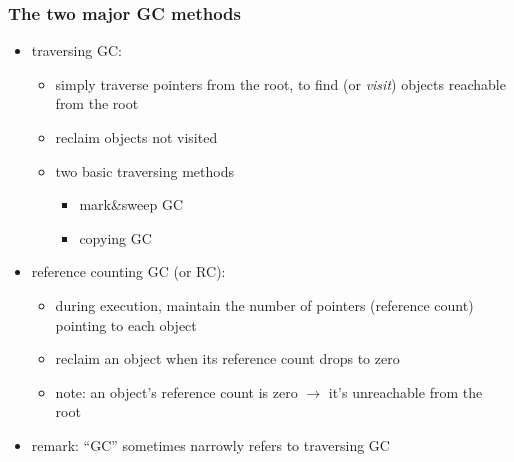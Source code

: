 \documentclass[12pt,dvipdfmx]{beamer}
\newif\ifja
\newif\ifeng
\newcommand{\mura}[1]{{\color{purple}#1}}
\newcommand{\ao}[1]{{\color{blue}#1}}
\begin{document}
\begin{frame}
\frametitle{The two major GC methods}
\begin{itemize}
\item \ao{traversing GC:}
  \begin{itemize}
  \item simply traverse pointers from the root, to find (or {\it visit})
    objects \mura{reachable from the root}
  \item \mura{reclaim objects not visited}
  \item two basic traversing methods 
    \begin{itemize}
    \item \ao{mark\&sweep GC}
    \item \ao{copying GC}
    \end{itemize}
  \end{itemize}
\item \ao{reference counting GC (or RC):}
  \begin{itemize}
  \item during execution,
    \mura{maintain the number of pointers (reference count)}
    pointing to each object 
  \item \mura{reclaim an object when its reference count drops to zero}
  \item note: an object's reference count is zero
    $\rightarrow$ it's unreachable from the root
  \end{itemize}
\item remark: ``GC'' sometimes narrowly refers to traversing GC
\end{itemize}
\end{frame}
\fi

\ifja
\subsubsection{走査型GC}
\fi
\ifeng
\end{document}
